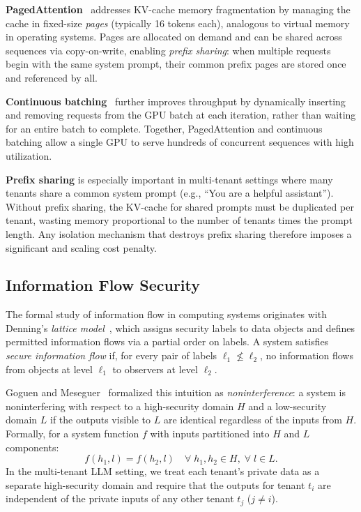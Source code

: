 \documentclass[11pt]{article}
\begin{document}
\textbf{PagedAttention}~\citep{kwon2023vllm} addresses KV-cache memory
fragmentation by managing the cache in fixed-size \emph{pages} (typically
16 tokens each), analogous to virtual memory in operating systems.  Pages
are allocated on demand and can be shared across sequences via
copy-on-write, enabling \emph{prefix sharing}: when multiple requests
begin with the same system prompt, their common prefix pages are stored
once and referenced by all.

\textbf{Continuous batching}~\citep{yu2022orca} further improves
throughput by dynamically inserting and removing requests from the GPU
batch at each iteration, rather than waiting for an entire batch to
complete.  Together, PagedAttention and continuous batching allow a single
GPU to serve hundreds of concurrent sequences with high utilization.

\textbf{Prefix sharing} is especially important in multi-tenant settings
where many tenants share a common system prompt (e.g., ``You are a helpful
assistant'').  Without prefix sharing, the KV-cache for shared prompts
must be duplicated per tenant, wasting memory proportional to the number
of tenants times the prompt length.  Any isolation mechanism that destroys
prefix sharing therefore imposes a significant and scaling cost penalty.

\subsection{Information Flow Security}
\label{sec:bg_infoflow}

The formal study of information flow in computing systems originates with
Denning's \emph{lattice model}~\citep{denning1976lattice}, which assigns
security labels to data objects and defines permitted information flows via
a partial order on labels.  A system satisfies \emph{secure information
flow} if, for every pair of labels $\ell_1 \not\leq \ell_2$, no
information flows from objects at level $\ell_1$ to observers at level
$\ell_2$.

Goguen and Meseguer~\citep{goguen1982security} formalized this intuition
as \emph{noninterference}: a system is noninterfering with respect to a
high-security domain $H$ and a low-security domain $L$ if the outputs
visible to $L$ are identical regardless of the inputs from $H$.  Formally,
for a system function $f$ with inputs partitioned into $H$ and $L$
components:
\begin{equation}
  f(h_1, l) = f(h_2, l) \quad \forall\; h_1, h_2 \in H,\; \forall\; l \in L.
  \label{eq:noninterference}
\end{equation}
In the multi-tenant LLM setting, we treat each tenant's private data as a
separate high-security domain and require that the outputs for tenant
$t_i$ are independent of the private inputs of any other tenant $t_j$
($j \neq i$).
\end{document}

